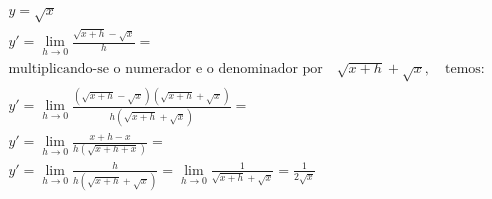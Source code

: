 \begin{ex}
\begin{align}
&y=\sqrt{x}\nonumber\\
&y'=\lim_{h\rightarrow 0} \frac{\sqrt{x+h}-\sqrt{x}}{h}=\nonumber\\
&\text{multiplicando-se o numerador e o denominador por}\quad\sqrt{x+h}+\sqrt{x},\quad\text{temos:}\nonumber\\
&y'=\lim_{h\rightarrow 0} \frac{(\sqrt{x+h}-\sqrt{x})(\sqrt{x+h}+\sqrt{x})}{h(\sqrt{x+h}+\sqrt{x})}=\nonumber\\
&y'=\lim_{h\rightarrow 0} \frac{x+h-x}{h(\sqrt{x+h+x})}=\nonumber\\
&y'=\lim_{h\rightarrow 0} \frac{h}{h(\sqrt{x+h}+\sqrt{x})}=\lim_{h\rightarrow 0} \frac{1}{\sqrt{x+h}+\sqrt{x}}=\frac{1}{2\sqrt{x}}\nonumber
\end{align}
\end{ex}